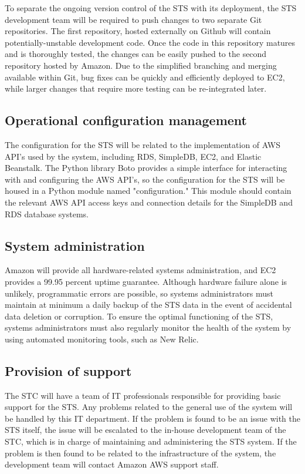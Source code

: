 \documentclass[a4paper,11pt]{report}
\begin{document}
To separate the ongoing version control of the STS with its deployment, the STS
development team will be required to push changes to two separate Git
repositories. The first repository, hosted externally on Github will contain
potentially-unstable development code. Once the code in this repository matures
and is thoroughly tested, the changes can be easily pushed to the second
repository hosted by Amazon. Due to the simplified branching and merging
available within Git, bug fixes can be quickly and efficiently deployed to EC2,
while larger changes that require more testing can be re-integrated later.

\subsection{Operational configuration management}
\label{sec:oper-conf-manag}


The configuration for the STS will be related to the implementation of AWS API's
used by the system, including RDS, SimpleDB, EC2, and Elastic Beanstalk. The
Python library Boto provides a simple interface for interacting with and
configuring the AWS API's, so the configuration for the STS will be housed in a
Python module named "configuration." This module should contain the relevant
AWS API access keys and connection details for the SimpleDB and RDS database
systems.

\subsection{System administration}
\label{sec:syst-admin}


Amazon will provide all hardware-related systems administration, and EC2 
provides a 99.95 percent uptime guarantee. Although hardware failure alone is
unlikely, programmatic errors are possible, so systems administrators must
maintain at minimum a daily backup of the STS data in the event of accidental
data deletion or corruption. To ensure the optimal functioning of the STS,
systems administrators must also regularly monitor the health of the system by
using automated monitoring tools, such as New Relic.

\subsection{Provision of support}
\label{sec:provision-support}


The STC will have a team of IT professionals responsible for providing basic
support for the STS. Any problems related to the general use of the system will
be handled by this IT department. If the problem is found to be an issue with 
the STS itself, the issue will be escalated to the in-house development team of
the STC, which is in charge of maintaining and administering the STS system. If
the problem is then found to be related to the infrastructure of the system, 
the development team will contact Amazon AWS support staff.
\end{document}
